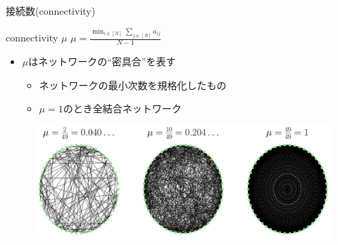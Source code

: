 
\begin{frame}{接続数(connectivity)}
\begin{block}{connectivity $\mu$}
\centering
$\displaystyle\mu = \frac{\min_{i\in[N]}\sum_{j\in[N]}a_{ij}}{N-1}$
\end{block}
\begin{itemize}
    \item $\mu$はネットワークの``密具合''を表す
    \begin{itemize}
        \item ネットワークの最小次数を規格化したもの
        \item $\mu=1$のとき全結合ネットワーク
    \end{itemize}
\end{itemize}
\begin{figure}
    \centering
    \includegraphics[width=\textwidth]{figs/mu.pdf}
\end{figure}
\end{frame}


